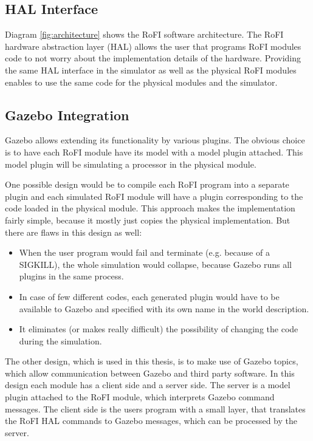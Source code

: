 \documentclass[
  digital, %
  table,   %
  oneside, %
  nolof,     %
  nolot,     %
]{fithesis3}
\begin{document}


\subsection{HAL Interface}

Diagram \ref{fig:architecture} shows the RoFI software architecture.
The RoFI hardware abstraction layer (HAL) allows the user that programs RoFI modules code to not worry about the implementation details of the hardware.
Providing the same HAL interface in the simulator as well as the physical RoFI modules enables to use the same code for the physical modules and the simulator.

\subsection{Gazebo Integration}

Gazebo allows extending its functionality by various plugins.
The obvious choice is to have each RoFI module have its model with a model plugin attached.
This model plugin will be simulating a processor in the physical module.

One possible design would be to compile each RoFI program into a separate plugin and each simulated RoFI module will have a plugin corresponding to the code loaded in the physical module.
This approach makes the implementation fairly simple, because it mostly just copies the physical implementation.
But there are flaws in this design as well:
\begin{itemize}
    \item When the user program would fail and terminate (e.g. because of a SIGKILL), the whole simulation would collapse, because Gazebo runs all plugins in the same process.
    \item In case of few different codes, each generated plugin would have to be available to Gazebo and specified with its own name in the world description.
    \item It eliminates (or makes really difficult) the possibility of changing the code during the simulation.
\end{itemize}

The other design, which is used in this thesis, is to make use of Gazebo topics, which allow communication between Gazebo and third party software.
In this design each module has a client side and a server side.
The server is a model plugin attached to the RoFI module, which interprets Gazebo command messages.
The client side is the users program with a small layer, that translates the RoFI HAL commands to Gazebo messages, which can be processed by the server.
\end{document}
